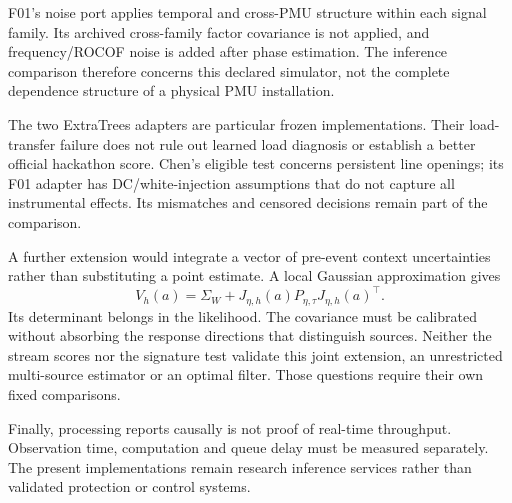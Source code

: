 F01's noise port applies temporal and cross-PMU structure within each
signal family. Its archived cross-family factor covariance is not applied,
and frequency/ROCOF noise is added after phase estimation. The inference
comparison therefore concerns this declared simulator, not the complete
dependence structure of a physical PMU installation.

The two ExtraTrees adapters are particular frozen implementations. Their
load-transfer failure does not rule out learned load diagnosis or establish
a better official hackathon score. Chen's eligible test concerns persistent
line openings; its F01 adapter has DC/white-injection assumptions that do
not capture all instrumental effects. Its mismatches and censored decisions
remain part of the comparison.

A further extension would integrate a vector of pre-event context uncertainties rather
than substituting a point estimate. A local Gaussian approximation gives
\begin{equation}
 V_h(a)=\Sigma_W+J_{\eta,h}(a)P_{\eta,\tau}J_{\eta,h}(a)^\top.
 \label{eq:context-conditioned-extension}
\end{equation}
Its determinant belongs in the likelihood. The covariance must be
calibrated without absorbing the response directions that distinguish
sources. Neither the stream scores nor the signature test validate this
joint extension, an unrestricted multi-source estimator or an optimal
filter. Those questions require their own fixed comparisons.

Finally, processing reports causally is not proof of real-time throughput.
Observation time, computation and queue delay must be measured separately.
The present implementations remain research inference services rather
than validated protection or control systems.
